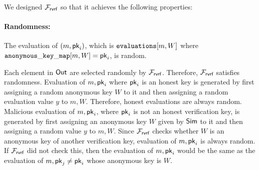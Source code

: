 %
%

We designed $ \mathcal{F}_{\textsf{rvrf}} $ so that it achieves the following properties:

\paragraph{Randomness:}  The evaluation of $ (m, \mathsf{pk}_i) $,  which is $ \texttt{evaluations}[m,W] $ where $ \mathtt{anonymous\_key\_map}[m,W] = \mathsf{pk}_i $, is random.


Each element in $ {\mathsf{Out}} $ are selected randomly by $ \mathcal{F}_{\textsf{rvrf}} $. Therefore, $ \mathcal{F}_{\textsf{rvrf}} $ satisfies randomness.  Evaluation of $ m, \mathsf{pk}_i $ where $ \mathsf{pk}_i $ is an honest key is generated by first assigning a random anonymous key $ W $ to it and then assigning a random evaluation value $ y $ to $ m, W $. Therefore, honest evaluations are always random. Malicious evaluation of $ m, \mathsf{pk}_i $, where $ \mathsf{pk}_i $ is not an honest verification key, is generated by first assigning an anonymous key $ W $ given by $ \mathsf{Sim} $ to it and then assigning a random value $ y $ to $ m, W $. Since $ \mathcal{F}_{\textsf{rvrf}} $ checks whether $ W $ is an anonymous key of another verification key, evaluation of $ m, \mathsf{pk}_i $ is always random. If $ \mathcal{F}_{\textsf{rvrf}} $ did not check this, then the evaluation of $ m, \mathsf{pk}_i $ would be the same as the evaluation of $ m, \mathsf{pk}_j  \neq \mathsf{pk}_i$ whose anonymous key is $ W $.


